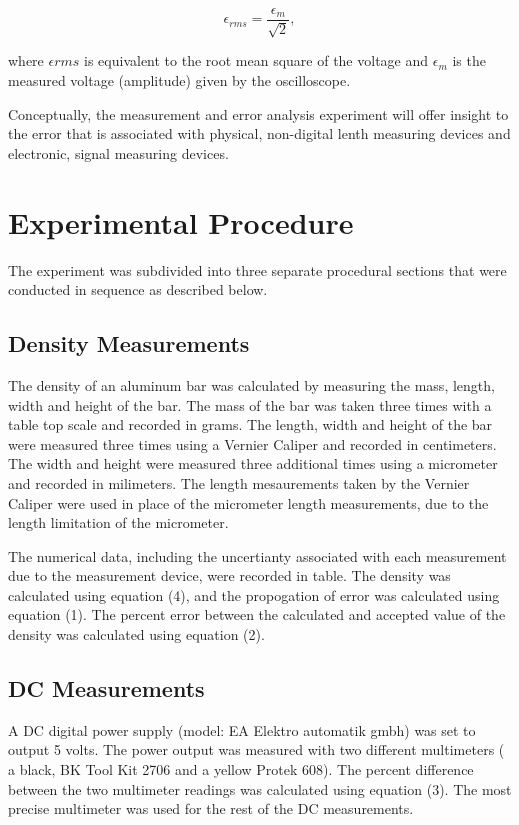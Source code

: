 \documentclass[twoside,10pt]{article}
\begin{document}
\begin{multicols}{2}
 		
 		\begin{small}
 		\begin{equation}
		\epsilon_{rms} = \frac{\epsilon_{m}}{\sqrt{2}},
 		\end{equation}
 		\end{small}
 	
 	\noindent where $\epsilon{rms}$ is equivalent to the root mean square of the voltage and $\epsilon_m$ is the measured voltage (amplitude) given by the oscilloscope. 
 	
 	\indent Conceptually, the measurement and error analysis experiment will offer insight to the error that is associated with physical, non-digital lenth measuring devices and electronic, signal measuring devices. 
		
		\section{Experimental Procedure}
		The experiment was subdivided into three separate procedural sections that were conducted in sequence as described below. 	
		
		\subsection{Density Measurements}
		The density of an aluminum bar was calculated by measuring the mass, length, width and height of the bar. The mass of the bar was taken three times with a table top scale and recorded in grams. The length, width and height of the bar were measured three times using a Vernier Caliper and recorded in centimeters. The width and height were measured three additional times using a micrometer and recorded in milimeters. The length mesaurements taken by the Vernier Caliper were used in place of the micrometer length measurements, due to the length limitation of the micrometer. 
		
		\indent The numerical data, including the uncertianty associated with each measurement due to the measurement device, were recorded in table. The density was calculated using equation (4), and the propogation of error was calculated using equation (1). The percent error between the calculated and accepted value of the density was calculated using equation (2). 
		
		\subsection{DC Measurements}
		A DC digital power supply (model: EA Elektro automatik gmbh) was set to output 5 volts. The power output was measured with two different multimeters ( a black, BK Tool Kit 2706 and a yellow Protek 608). The percent difference between the two multimeter readings was calculated using equation (3). The most precise multimeter was used for the rest of the DC measurements. 
		

\end{multicols}
\end{document}

